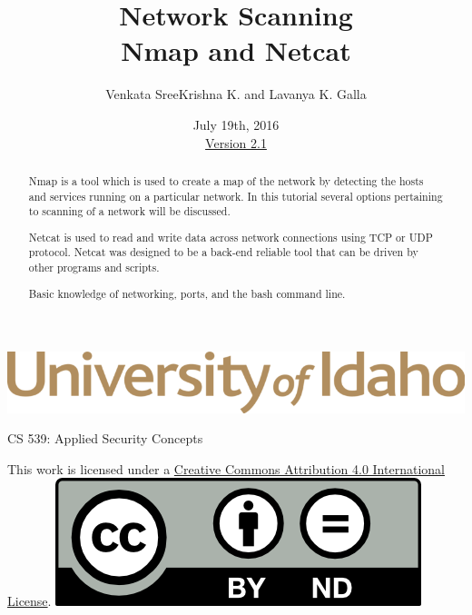 \documentclass[12pt]{extarticle}
\begin{document}
\title{ Network Scanning \\ \large Nmap and Netcat}
\author{Venkata SreeKrishna K. and Lavanya K. Galla}
\date{July 19th, 2016 \\ \hyperref[changelog]{Version 2.1}} %
\renewcommand{\abstractname}{Executive Summary}
\begin{titlepage}
\maketitle
\keepthetitle %
\begin{center}
\includegraphics[scale=.30]{UofI}

\large{CS 539: Applied Security Concepts}

\vskip 40pt

\end{center}
\begin{abstract}
Nmap is a tool which is used to create a map of the network by detecting the hosts and services running on a particular network. In this tutorial several options pertaining to scanning of a network will be discussed.

Netcat is used to read and write data across network connections using TCP or UDP protocol. Netcat was designed to be a back-end reliable tool that can be driven by other programs and scripts.


Basic knowledge of networking, ports, and the bash command line.
\end{abstract}


\vfill
\begin{center}
This work is licensed under a \href{http://creativecommons.org/licenses/by/4.0/}{Creative Commons Attribution 4.0 International License}.
\vskip 10pt
\includegraphics[scale=.5]{cc}
\end{center}

\end{titlepage}
\end{document}
